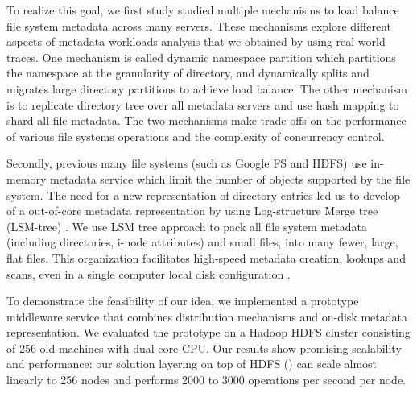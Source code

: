 To realize this goal, we first study studied multiple mechanisms to
load balance file system metadata across many servers.
These mechanisms explore different aspects of metadata workloads analysis
that we obtained by using real-world traces.
One mechanism is called dynamic namespace partition
which partitions the namespace at the granularity of directory,
and dynamically splits and migrates large directory partitions
to achieve load balance.
The other mechanism is to replicate directory tree over all
metadata servers and use hash mapping to shard all file metadata.
The two mechanisms make trade-offs on the performance of
various file systems operations and the complexity of concurrency
control.

Secondly, previous many file systems (such as Google FS
and HDFS) use in-memory metadata service which limit the number
of objects supported by the file system.
The need for a new representation of directory entries led us to develop
of a out-of-core metadata representation by using
Log-structure Merge tree (LSM-tree) \cite{ONeil1996}.
We use LSM tree approach to pack all file system metadata
(including directories, i-node attributes) and small files,
into many fewer, large, flat files.
This organization facilitates high-speed metadata creation, lookups and scans,
even in a single computer local disk configuration \cite{TableFS}.

To demonstrate the feasibility of our idea,
we implemented a prototype middleware service that
combines distribution mechanisms and on-disk metadata representation.
We evaluated the prototype on a Hadoop HDFS cluster \cite{HDFS} consisting of 256 
old machines with dual core CPU.
Our results show promising scalability and performance:
our solution layering on top of HDFS (\psys) can scale almost linearly
to 256 nodes and performs 2000 to 3000 operations per second
per node.
